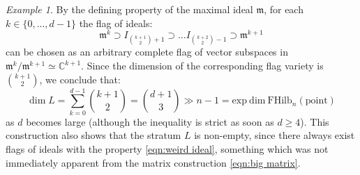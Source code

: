 \documentclass[12pt]{amsart}
\numberwithin{equation}{section}
\theoremstyle{definition}
\theoremstyle{remark}
\newtheorem{example}[theorem]{Example}
\newcommand{\CC}{\mathbb{C}}
\renewcommand{\1}{\mathbf{1}}
\newcommand{\FH}{\mathrm{FHilb}}
\newcommand{\point}{\mathrm{point}}
\newcommand{\fm}{\mathfrak{m}}
\newcommand{\expdim}{\mathrm{exp \ dim \ }}
\begin{document}
\begin{example}
By the defining property of the maximal ideal $\fm$, for each $k \in \{0,...,d-1\}$ the flag of ideals: 
$$
\mathfrak{m}^{k}\supset I_{\binom{k+1}{2}+1}\supset \ldots I_{\binom{k+2}{2}-1} \supset \mathfrak{m}^{k+1}
$$
can be chosen as an arbitrary complete flag of vector subspaces in $\mathfrak{m}^{k}/\mathfrak{m}^{k+1}\simeq \CC^{k+1}$. Since the dimension of the corresponding flag variety is $\binom{k+1}{2}$, we conclude that:
$$
\dim L = \sum_{k=0}^{d-1}\binom{k+1}{2}=\binom{d+1}{3} \gg n-1 = \expdim \FH_n(\point) 
$$
as $d$ becomes large (although the inequality is strict as soon as $d\geq 4$). This construction also shows that the stratum $L$ is non-empty, since there always exist flags of ideals with the property \eqref{eqn:weird ideal}, something which was not immediately apparent from the matrix construction \eqref{eqn:big matrix}.

\end{example}
\end{document}
